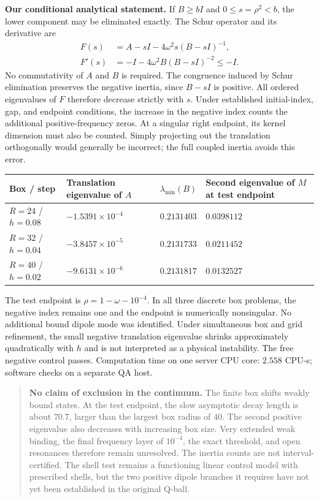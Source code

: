 \documentclass[a4paper,11pt]{article}
\newenvironment{drafttable}{\begin{center}\small\renewcommand{\arraystretch}{1.2}}{\end{center}}
\begin{document}
\textbf{Our conditional analytical statement.} If $B\geq bI$ and $0\leq s=\rho^2<b$, the lower component may be eliminated exactly. The Schur operator and its derivative are
\begin{equation}\label{eq:schur}
\begin{aligned}
F(s)&=A-sI-4\omega^2s(B-sI)^{-1},\\
F'(s)&=-I-4\omega^2B(B-sI)^{-2}\leq-I.
\end{aligned}
\end{equation}
No commutativity of $A$ and $B$ is required. The congruence induced by Schur elimination preserves the negative inertia, since $B-sI$ is positive. All ordered eigenvalues of $F$ therefore decrease strictly with $s$. Under established initial-index, gap, and endpoint conditions, the increase in the negative index counts the additional positive-frequency zeros. At a singular right endpoint, its kernel dimension must also be counted. Simply projecting out the translation orthogonally would generally be incorrect; the full coupled inertia avoids this error.

\begin{drafttable}
\begin{tabularx}{\linewidth}{@{}lXXX@{}}\toprule
Box / step & Translation eigenvalue of $A$ & $\lambda_{\min}(B)$ & Second eigenvalue of $M$ at test endpoint\\\midrule
$R=24$ / $h=0.08$ & $-1.5391\times10^{-4}$ & $0.2131403$ & $0.0398112$\\
$R=32$ / $h=0.04$ & $-3.8457\times10^{-5}$ & $0.2131733$ & $0.0211452$\\
$R=40$ / $h=0.02$ & $-9.6131\times10^{-6}$ & $0.2131817$ & $0.0132527$\\\bottomrule
\end{tabularx}
\end{drafttable}
The test endpoint is $\rho=1-\omega-10^{-4}$. In all three discrete box problems, the negative index remains one and the endpoint is numerically nonsingular. No additional bound dipole mode was identified. Under simultaneous box and grid refinement, the small negative translation eigenvalue shrinks approximately quadratically with $h$ and is not interpreted as a physical instability. The free negative control passes. Computation time on one server CPU core: $2.558$ CPU-s; software checks on a separate QA host.

\begin{quote}\textbf{No claim of exclusion in the continuum.}
The finite box shifts weakly bound states. At the test endpoint, the slow asymptotic decay length is about $70.7$, larger than the largest box radius of $40$. The second positive eigenvalue also decreases with increasing box size. Very extended weak binding, the final frequency layer of $10^{-4}$, the exact threshold, and open resonances therefore remain unresolved. The inertia counts are not interval-certified. The shell test remains a functioning linear control model with prescribed shells, but the two positive dipole branches it requires have not yet been established in the original Q-ball.
\end{quote}
\end{document}
